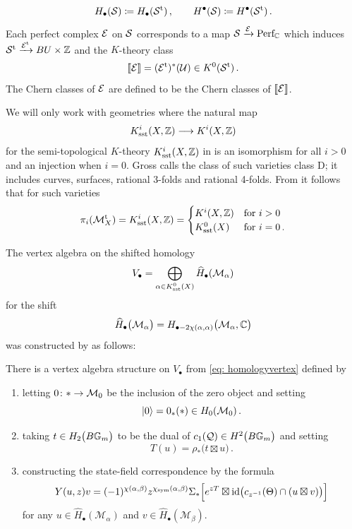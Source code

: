 \documentclass[a4paper, 12pt]{amsart}
\begin{document}
$$
H_\bullet({\mathcal S}) \coloneqq H_\bullet({\mathcal S}^{\text{t}})\, ,\qquad H^\bullet({\mathcal S})\coloneqq H^\bullet({\mathcal S}^{\text{t}})\,.
$$
Each perfect complex ${\mathcal E}$ on ${\mathcal S}$ corresponds to a map 
$
{\mathcal S}\xrightarrow{{\mathcal E}} \text{Perf}_{{\mathbb{C}}}
$ which induces ${\mathcal S}^{\text{t}}\xrightarrow{{\mathcal E}^\text{t}}BU\times {\mathbb{Z}}$ and the $K$-theory class
$$
\llbracket {\mathcal E} \rrbracket= ({\mathcal E}^{\text{t}})^*({\mathcal U}) \in K^0({\mathcal S}^{\text{t}})\,.
$$
The Chern classes of ${\mathcal E}$ are defined to be the Chern classes of $\llbracket {\mathcal E}\rrbracket$.
\begin{remark}\label{rem: classD}
  We will only work with geometries where the natural map
    $$
    K^i_{\text{sst}}(X, {\mathbb{Z}})\longrightarrow K^i(X, {\mathbb{Z}})
    $$
    for the semi-topological $K$-theory $K^i_{\text{sst}}(X, {\mathbb{Z}})$ in \cite{FW} is an isomorphism for all $i>0$ and an injection when $i=0$. Gross \cite{Gr19} calls the class of such varieties class D; it includes curves, surfaces, rational 3-folds and rational 4-folds. From \cite[Theorem 4.21]{B16} it follows that for such varieties
    $$
    \pi_i(\mathcal{M}_X^\text{t}) = K^i_{\text{sst}}(X,{\mathbb{Z}})=\begin{cases}K^i(X, {\mathbb{Z}})&\textup{for }i>0\\
    K_{\text{sst}}^0(X)&\textup{for }i=0\,.\end{cases}
    $$
\end{remark}
The vertex algebra on the shifted homology 
\begin{equation}
\label{eq: homologyvertex}
V_\bullet = \bigoplus_{\alpha\in K_{\text{sst}}^0(X)}\widehat{H}_\bullet(\mathcal{M}_{\alpha}) 
\end{equation}
for the shift 
$$
\widehat{H}_\bullet\big(\mathcal{M}_{\alpha}\big)= H_{\bullet-2\chi(\alpha,\alpha)}\big(\mathcal{M}_{\alpha},{\mathbb{C}}\big)
$$
was constructed by \cite{Jo17} as follows:
\begin{theorem}[{\cite[Theorem 3.12]{Jo17}}]\label{thm: geometricvaconstruction}
There is a vertex algebra structure on $V_\bullet$ from \eqref{eq: homologyvertex} defined by 
\begin{enumerate}
    \item letting $0\colon*\to {\mathcal M}_0$ be the inclusion of the zero object and setting 
    $$
    \ket{0}=0_*(*)\in H_0({\mathcal M}_0)\,.
    $$
    \item taking $t\in H_2\big(B{\mathbb{G}}_m\big)$ to be the dual of $c_1({\mathcal Q})\in H^2\big(B{\mathbb{G}}_m\big)$ and setting 
    $$
    T(u) = \rho_\ast\big(t\boxtimes u\big)\,.
    $$
    \item constructing the state-field correspondence by the formula 
    \begin{equation}\label{eq: joycefields}
    Y(u,z)v = (-1)^{\chi(\alpha,\beta)}z^{\chi_{\text{sym}}(\alpha,\beta)}\Sigma_\ast\Big[e^{zT}\boxtimes \text{id}\big(c_{z^{-1}}(\Theta)\cap (u\boxtimes v)\big)\Big]
    \end{equation}
for any $u\in \widehat{H}_\bullet(\mathcal{M}_\alpha)$ and $v\in \widehat{H}_\bullet(\mathcal{M}_{\beta})$.
\end{enumerate}
\end{theorem}
\end{document}
